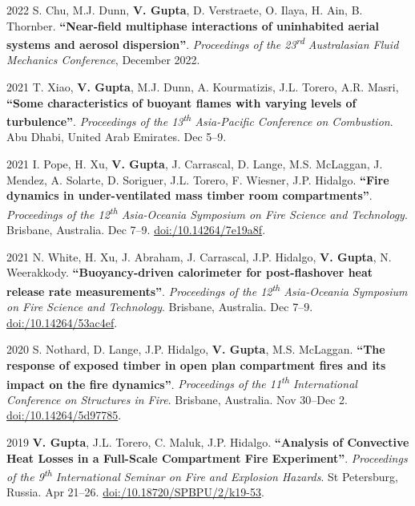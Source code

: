 \documentclass[12pt,letterpaper]{report}
\begin{document}
\begin{tablist}
		\item[2022] \tab S. Chu, M.J. Dunn, \textbf{V. Gupta}, D. Verstraete, O. Ilaya, H. Ain, B. Thornber. \textbf{\enquote{\textbf{Near-field multiphase interactions of uninhabited aerial systems and aerosol dispersion}}}. \textit{Proceedings of the 23\textsuperscript{rd} Australasian Fluid Mechanics Conference}, December 2022.
	
		\item[2021] \tab T. Xiao, \textbf{V. Gupta}, M.J. Dunn, A. Kourmatizis, J.L. Torero, A.R. Masri, \textbf{\enquote{Some characteristics of buoyant flames with varying levels of turbulence}}. \textit{Proceedings of the 13\textsuperscript{th} Asia-Pacific Conference on Combustion}. Abu Dhabi, United Arab Emirates. Dec 5--9.

		\item[2021] \tab I. Pope, H. Xu, \textbf{V. Gupta}, J. Carrascal, D. Lange, M.S. McLaggan, J. Mendez, A. Solarte, D. Soriguer, J.L. Torero, F. Wiesner, J.P. Hidalgo. \textbf{\enquote{Fire dynamics in under-ventilated mass timber room compartments}}. \textit{Proceedings of the 12\textsuperscript{th} Asia-Oceania Symposium on Fire Science and Technology}. Brisbane, Australia. Dec 7--9. \href{https://doi.org/10.14264/7e19a8f}{doi:/10.14264/7e19a8f}.			

		\item[2021] \tab N. White, H. Xu, J. Abraham, J. Carrascal, J.P. Hidalgo, \textbf{V. Gupta}, N. Weerakkody. \textbf{\enquote{Buoyancy-driven calorimeter for post-flashover heat release rate measurements}}. \textit{Proceedings of the 12\textsuperscript{th} Asia-Oceania Symposium on Fire Science and Technology}. Brisbane, Australia. Dec 7--9. \href{https://doi.org/10.14264/53ac4ef}{doi:/10.14264/53ac4ef}.
	      
	      \item[2020] \tab S. Nothard, D. Lange, J.P. Hidalgo, \textbf{V. Gupta}, M.S. McLaggan. \textbf{\enquote{The response of exposed timber in open plan compartment fires and its impact on the fire dynamics}}. \textit{Proceedings of the 11\textsuperscript{th} International Conference on Structures in Fire}. Brisbane, Australia. Nov 30--Dec 2. \href{https://doi.org/10.14264/5d97785}{doi:/10.14264/5d97785}.

	    \item[2019] \tab \textbf{V. Gupta}, J.L. Torero, C. Maluk, J.P. Hidalgo. \textbf{\enquote{Analysis of Convective Heat Losses in a Full-Scale Compartment Fire Experiment}}. \textit{Proceedings of the 9\textsuperscript{th} International Seminar on Fire and Explosion Hazards}. St Petersburg, Russia. Apr 21--26. \href{http://doi.org/10.18720/SPBPU/2/k19-53}{doi:/10.18720/SPBPU/2/k19-53}.

    \end{tablist}
    
\end{document}
